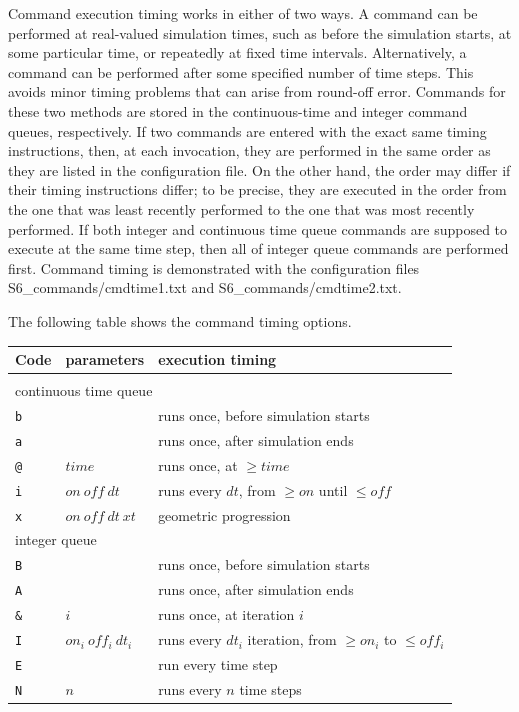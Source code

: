 \documentclass {book}
\newcommand {\ttt} {\texttt}
\begin{document}
Command execution timing works in either of two ways. A command can be performed at real-valued simulation times, such as before the simulation starts, at some particular time, or repeatedly at fixed time intervals. Alternatively, a command can be performed after some specified number of time steps. This avoids minor timing problems that can arise from round-off error. Commands for these two methods are stored in the continuous-time and integer command queues, respectively. If two commands are entered with the exact same timing instructions, then, at each invocation, they are performed in the same order as they are listed in the configuration file. On the other hand, the order may differ if their timing instructions differ; to be precise, they are executed in the order from the one that was least recently performed to the one that was most recently performed. If both integer and continuous time queue commands are supposed to execute at the same time step, then all of integer queue commands are performed first. Command timing is demonstrated with the configuration files S6\_commands/cmdtime1.txt and S6\_commands/cmdtime2.txt.

The following table shows the command timing options.

\begin{longtable}[c]{lll}
Code & parameters & execution timing\\
\hline\\
\multicolumn{3}{l}{continuous time queue}\\
\ttt{b} &  & runs once, before simulation starts\\
\ttt{a} &  & runs once, after simulation ends\\
\ttt{@} & $time$ & runs once, at $\geq time$\\
\ttt{i} & $on\ off\ dt$ & runs every $dt$, from $\geq on$ until $\leq off$\\
\ttt{x} & $on\ off\ dt\ xt$ & geometric progression\\
\multicolumn{3}{l}{integer queue}\\
\ttt{B} &  & runs once, before simulation starts\\
\ttt{A} &  & runs once, after simulation ends\\
\ttt{\&} & $i$ & runs once, at iteration $i$\\
\ttt{I} & $on_i\ off_i\ dt_i$ & runs every $dt_i$ iteration, from $\geq on_i$ to $\leq off_i$\\
\ttt{E} &  & run every time step\\
\ttt{N} & $n$ & runs every $n$ time steps
\end{longtable}
\end{document}
